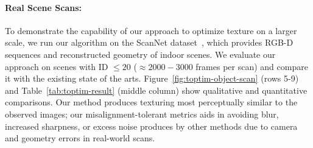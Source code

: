 \paragraph*{Real Scene Scans:}
To demonstrate the capability of our approach to optimize texture on a larger scale, we run our algorithm on the ScanNet dataset~\cite{dai2017scannet}, which provides RGB-D sequences and reconstructed geometry of indoor scenes.
We evaluate our approach on scenes with ID $\leq 20$ ($\approx 2000-3000$ frames per scan) and compare it with the existing state of the arts. 
Figure~\ref{fig:toptim-object-scan} (rows 5-9) and Table~\ref{tab:toptim-result} (middle column) show qualitative and quantitative comparisons. 
Our method produces texturing most perceptually similar to the observed images; our misalignment-tolerant metrics aids in avoiding blur, increased sharpness, or excess noise produces by other methods due to camera and geometry errors in real-world scans.

